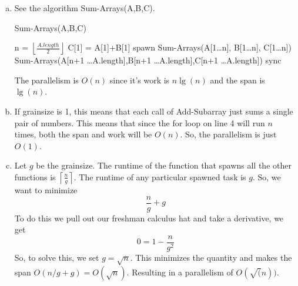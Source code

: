 \documentclass{article}
\begin{document}
\begin{enumerate}[a.]
\item
See the algorithm Sum-Arrays(A,B,C).
\begin{algorithm}
\caption{Sum-Arrays(A,B,C)}
\begin{algorithmic}
\State n = $\left\lfloor \frac{A.length}{2} \right\rfloor$
\State C[1] = A[1]+B[1]
\Else
\State spawn Sum-Arrays(A[1\ldots n], B[1\ldots n], C[1\ldots n])
\State Sum-Arrays(A[n+1 \ldots A.length],B[n+1 \ldots A.length],C[n+1 \ldots A.length])
\State sync
\EndIf
\end{algorithmic}
\end{algorithm}
The parallelism is $O(n)$ since it's work is $n\lg(n)$ and the span is $\lg(n)$. 
\item
If grainsize is 1, this means that each call of Add-Subarray just sums a single pair of numbers. This means that since the for loop on line 4 will run $n$ times, both the span and work will be $O(n)$. So, the parallelism is just $O(1)$.
\item
Let $g$ be the grainsize. The runtime of the function that spawns all the other functions is $\left\lceil \frac{n}{g} \right\rceil$. The runtime of any particular spawned task is $g$. So, we want to minimize 
\[
\frac{n}{g}+g
\]
To do this we pull out our freshman calculus hat and take a derivative, we get
\[
0 = 1 - \frac{n}{g^2}
\]
So, to solve this, we set $g = \sqrt{n}$. This minimizes the quantity and makes the span $O(n/g +g) = O(\sqrt{n})$. Resulting in a parallelism of $O(\sqrt(n))$.
\end{enumerate}
\end{document}
